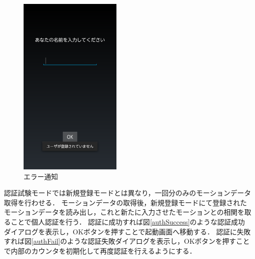 \documentclass[11pt]{jreport}
\begin{document}
\begin{figure}[htbp]
            \begin{minipage}{0.33\hsize}
                \begin{center}
                    \includegraphics[width=5cm, bb=0 0 540 960]{AuthNameInputError.pdf}
                \end{center}
                \caption{エラー通知}
                \label{authNameInputError}
            \end{minipage}
        \end{figure}

        認証試験モードでは新規登録モードとは異なり，一回分のみのモーションデータ取得を行わせる．
        モーションデータの取得後，新規登録モードにて登録されたモーションデータを読み出し，これと新たに入力させたモーションとの相関を取ることで個人認証を行う．
        認証に成功すれば図\ref{authSuccess}のような認証成功ダイアログを表示し，OKボタンを押すことで起動画面へ移動する．
        認証に失敗すれば図\ref{authFail}のような認証失敗ダイアログを表示し，OKボタンを押すことで内部のカウンタを初期化して再度認証を行えるようにする．
\end{document}
